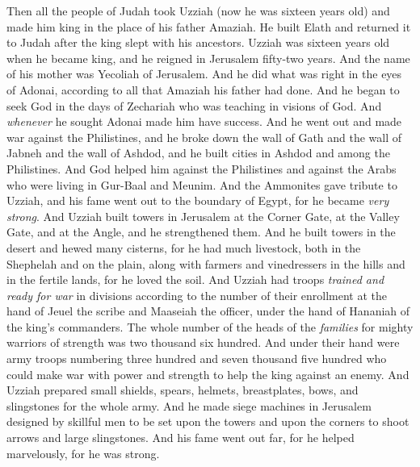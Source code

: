 \begin{biblechapter} %
 Then all the people of Judah took Uzziah (now he was sixteen years old) and made him king in the place of his father Amaziah.
\verse He built Elath and returned it to Judah after the king slept with his ancestors.
\verse Uzziah was sixteen years old when he became king, and he reigned in Jerusalem fifty-two years. And the name of his mother was Yecoliah of Jerusalem.
\verse And he did what was right in the eyes of Adonai, according to all that Amaziah his father had done.
\verse And he began to seek God in the days of Zechariah who was teaching in visions of God. And \textit{whenever} he sought Adonai made him have success.
\verse And he went out and made war against the Philistines, and he broke down the wall of Gath and the wall of Jabneh and the wall of Ashdod, and he built cities in Ashdod and among the Philistines.
\verse And God helped him against the Philistines and against the Arabs who were living in Gur-Baal and Meunim.
\verse And the Ammonites gave tribute to Uzziah, and his fame went out to the boundary of Egypt, for he became \textit{very strong}.
\verse And Uzziah built towers in Jerusalem at the Corner Gate, at the Valley Gate, and at the Angle, and he strengthened them.
\verse And he built towers in the desert and hewed many cisterns, for he had much livestock, both in the Shephelah and on the plain, along with farmers and vinedressers in the hills and in the fertile lands, for he loved the soil.
\verse And Uzziah had troops \textit{trained and ready for war} in divisions according to the number of their enrollment at the hand of Jeuel the scribe and Maaseiah the officer, under the hand of Hananiah of the king’s commanders.
\verse The whole number of the heads of the \textit{families} for mighty warriors of strength was two thousand six hundred.
\verse And under their hand were army troops numbering three hundred and seven thousand five hundred who could make war with power and strength to help the king against an enemy.
\verse And Uzziah prepared small shields, spears, helmets, breastplates, bows, and slingstones for the whole army.
\verse And he made siege machines in Jerusalem designed by skillful men to be set upon the towers and upon the corners to shoot arrows and large slingstones. And his fame went out far, for he helped marvelously, for he was strong.

\end{biblechapter}
